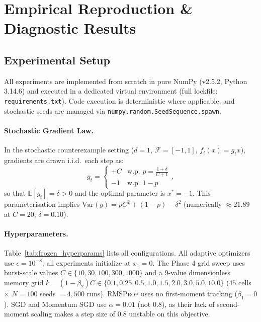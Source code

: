 \section{Empirical Reproduction \& Diagnostic Results}
\label{sec:reproduction}

\subsection{Experimental Setup}
All experiments are implemented from scratch in pure NumPy (v2.5.2, Python 3.14.6) and executed in a dedicated virtual environment (full lockfile: \nolinkurl{requirements.txt}). Code execution is deterministic where applicable, and stochastic seeds are managed via \texttt{numpy.random.SeedSequence.spawn}.

\paragraph{Stochastic Gradient Law.} In the stochastic counterexample setting ($d=1$, $\mathcal{F}=[-1,1]$, $f_t(x)=g_t x$), gradients are drawn i.i.d.\ each step as:
\begin{equation}
    g_t = \begin{cases} +C & \text{w.p. } p = \tfrac{1+\delta}{C+1} \\ -1 & \text{w.p. } 1-p \end{cases},
    \label{eq:grad_law}
\end{equation}
so that $\mathbb{E}[g_t] = \delta > 0$ and the optimal parameter is $x^* = -1$. This parameterisation implies $\text{Var}(g) = p C^2 + (1-p) - \delta^2$ (numerically $\approx 21.89$ at $C=20$, $\delta=0.10$).

\paragraph{Hyperparameters.} Table~\ref{tab:frozen_hyperparams} lists all configurations. All adaptive optimizers use $\epsilon = 10^{-8}$; all experiments initialize at $x_1 = 0$. The Phase 4 grid sweep uses burst-scale values $C \in \{10, 30, 100, 300, 1000\}$ and a 9-value dimensionless memory grid $k = (1-\beta_2)C \in \{0.1, 0.25, 0.5, 1.0, 1.5, 2.0, 3.0, 5.0, 10.0\}$ ($45$ cells $\times$ $N=100$ seeds $= 4{,}500$ runs). \textsc{RMSProp} uses no first-moment tracking ($\beta_1 = 0$). \textsc{SGD} and Momentum \textsc{SGD} use $\alpha = 0.01$ (not $0.8$), as their lack of second-moment scaling makes a step size of $0.8$ unstable on this objective.

